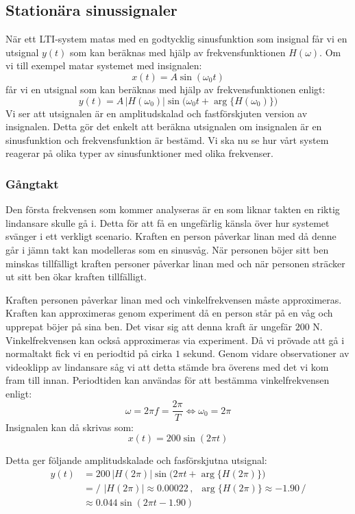 \subsection{Stationära sinussignaler}
När ett LTI-system matas med en godtycklig sinusfunktion som insignal får vi en utsignal $y(t)$ som kan beräknas med hjälp av frekvensfunktionen $H(\omega)$. Om vi till exempel matar systemet med insignalen:
$$x(t)=A\sin(\omega_0t)$$
får vi en utsignal som kan beräknas med hjälp av frekvensfunktionen enligt:
$$y(t)=A\,\big|H(\omega_0)\big|\sin\big(\omega_0t+\arg\big\{H(\omega_0)\big\}\big)$$
Vi ser att utsignalen är en amplitudskalad och fastförskjuten version av insignalen.
Detta gör det enkelt att beräkna utsignalen om insignalen är en sinusfunktion och frekvensfunktion är bestämd. Vi ska nu se hur vårt system reagerar på olika typer av sinusfunktioner med olika frekvenser.

\subsubsection{Gångtakt}
Den första frekvensen som kommer analyseras är en som liknar takten en riktig lindansare skulle gå i. Detta för att få en ungefärlig känsla över hur systemet svänger i ett verkligt scenario. Kraften en person påverkar linan med då denne går i jämn takt kan modelleras som en sinusvåg. När personen böjer sitt ben minskas tillfälligt kraften personer påverkar linan med och när personen sträcker ut sitt ben ökar kraften tillfälligt.

Kraften personen påverkar linan med och vinkelfrekvensen måste approximeras. Kraften kan approximeras genom experiment då en person står på en våg och upprepat böjer på sina ben. Det visar sig att denna kraft är ungefär $200$ N. Vinkelfrekvensen kan också approximeras via experiment. Då vi prövade att gå i normaltakt fick vi en periodtid på cirka $1$ sekund. Genom vidare observationer av videoklipp av lindansare såg vi att detta stämde bra överens med det vi kom fram till innan. Periodtiden kan användas för att bestämma vinkelfrekvensen enligt:
$$\omega=2\pi f= \dfrac{2\pi}{T} \Longleftrightarrow \omega_0 = 2\pi$$
Insignalen kan då skrivas som:
$$x(t)=200\sin(2\pi t)$$

Detta ger följande amplitudskalade och fasförskjutna utsignal:
$$\begin{aligned}y(t)&=200\,\big|H(2\pi)\big|\sin\big(2\pi t+\arg\big\{H(2\pi)\big\}\big)
\\&=\bigg/ \,\,\big|H(2\pi)\big|\approx 0.00022 \,,\,\,\, \arg\big\{H(2\pi)\big\}\approx -1.90  \,\bigg/
\\&\approx 0.044\sin(2\pi t - 1.90)\end{aligned}$$

